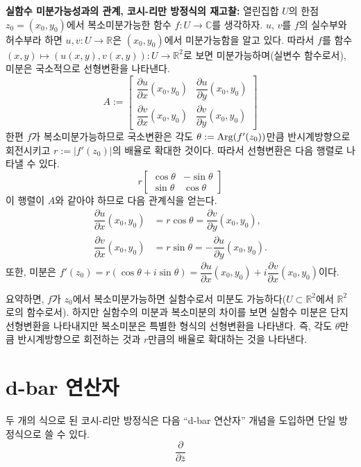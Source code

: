 {\bf 실함수 미분가능성과의 관계, 코시-리만 방정식의 재고찰:}
열린집합 $U$의 한점 $z_0=(x_0,y_0)$에서
복소미분가능한 함수 $f: U\to \mathbb C$를 생각하자.
$u$, $v$를 $f$의 실수부와 허수부라 하면
$u,v:U\to \mathbb R$은 $(x_0, y_0)$에서 미분가능함을 알고 있다.
따라서 $f$를 함수 $ (x,y) \mapsto (u(x,y), v(x,y)): U\to\mathbb R^2$로 보면
미분가능하며(실변수 함수로서), 미분은 국소적으로 선형변환을 나타낸다.
\[
A:= \begin{bmatrix}
\dfrac{\partial u}{\partial x}(x_0,y_0) & \dfrac{\partial u}{\partial y}(x_0,y_0) \\
\dfrac{\partial v}{\partial x}(x_0,y_0) & \dfrac{\partial v}{\partial y}(x_0,y_0) 
\end{bmatrix}
\]
한편 $f$가 복소미분가능하므로 국소변환은 각도 $\theta:=\mathop{\mathrm{Arg}}(f'(z_0))$만큼 
반시계방향으로 회전시키고 $r:=|f'(z_0)|$의 배율로 확대한 것이다.
따라서 선형변환은 다음 행렬로 나타낼 수 있다.
\[
r\begin{bmatrix}
\cos\theta & - \sin\theta \\
\sin\theta & \cos\theta
\end{bmatrix}
\]
이 행렬이 $A$와 같아야 하므로 다음 관계식을 얻는다.
\begin{align*}
\dfrac{\partial u}{\partial x}(x_0,y_0) &= r\cos\theta = \dfrac{\partial v}{\partial y}(x_0,y_0), \\
\dfrac{\partial v}{\partial x}(x_0,y_0) &= r\sin\theta = - \dfrac{\partial u}{\partial y}(x_0,y_0).
\end{align*}
또한, 미분은
$f'(z_0) = r(\cos\theta + i \sin\theta) = 
\dfrac{\partial u}{\partial x}(x_0,y_0) +i \dfrac{\partial v}{\partial x}(x_0,y_0)$이다.

요약하면, $f$가 $z_0$에서 복소미분가능하면
실함수로서 미분도 가능하다($U\subset \mathbb R^2$에서 $\mathbb R^2$로의 함수로서).
하지만 실함수의 미분과 복소미분의 차이를 보면
실함수 미분은 단지 선형변환을 나타내지만 복소미분은 특별한 형식의 선형변환을 나타낸다.
즉, 각도 $\theta$만큼 반시계방향으로 회전하는 것과 $r$만큼의 배율로 확대하는 것을 나타낸다.

\section{d-bar 연산자}

두 개의 식으로 된 코시-리만 방정식은 다음 ``d-bar 연산자'' 개념을 도입하면
단일 방정식으로 쓸 수 있다.
\[
\dfrac\partial {\partial \bar z}
\]


